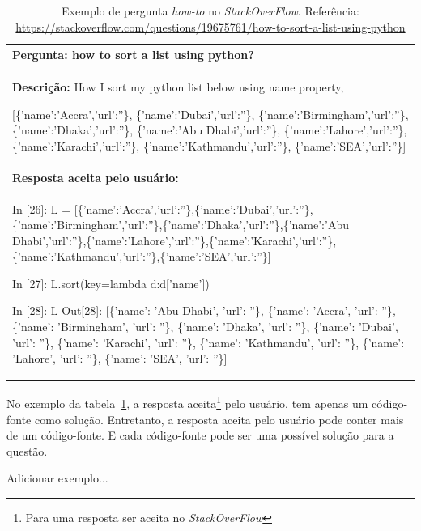 \begin{table}[h!]
\centering
\begin{tabular}{ |p{14cm}| } 
 \hline
 \textbf{Pergunta:} how to sort a list using python? \\ \hline
 \textbf{Descrição:} How I sort my python list below using name property,

 [\{'name':'Accra','url':''\},
  \{'name':'Dubai','url':''\},
  \{'name':'Birmingham','url':''\},
  \{'name':'Dhaka','url':''\},
  \{'name':'Abu Dhabi','url':''\},
  \{'name':'Lahore','url':''\},
  \{'name':'Karachi','url':''\},
  \{'name':'Kathmandu','url':''\},
  \{'name':'SEA','url':''\}]
 \\ \hline
 \textbf{Resposta aceita pelo usuário:}\\ 
 \hline
 In [26]: L = [\{'name':'Accra','url':''\},\{'name':'Dubai','url':''\},\newline\{'name':'Birmingham','url':''\},\{'name':'Dhaka','url':''\},\newline\{'name':'Abu Dhabi','url':''\},\{'name':'Lahore','url':''\},\newline\{'name':'Karachi','url':''\},\{'name':'Kathmandu','url':''\},\newline\{'name':'SEA','url':''\}]

In [27]: L.sort(key=lambda d:d['name'])

In [28]: L
Out[28]: 
[\{'name': 'Abu Dhabi', 'url': ''\},
 \{'name': 'Accra', 'url': ''\},
 \{'name': 'Birmingham', 'url': ''\},
 \{'name': 'Dhaka', 'url': ''\},
 \{'name': 'Dubai', 'url': ''\},
 \{'name': 'Karachi', 'url': ''\},
 \{'name': 'Kathmandu', 'url': ''\},
 \{'name': 'Lahore', 'url': ''\},
 \{'name': 'SEA', 'url': ''\}]\\ 
 \hline
\end{tabular}
\caption{Exemplo de pergunta \textit{how-to} no \textit{StackOverFlow}. Referência: \url{https://stackoverflow.com/questions/19675761/how-to-sort-a-list-using-python}}
\label{table:exemplo-pergunta-stack-over-flow-howto}
\end{table}


No exemplo da tabela~\ref{table:exemplo-pergunta-stack-over-flow-howto}, a resposta aceita\footnote{Para uma resposta ser aceita no \textit{StackOverFlow}} pelo usuário, tem apenas um código-fonte como solução. Entretanto, a resposta aceita pelo usuário pode conter mais de um código-fonte. E cada código-fonte pode ser uma possível solução para a questão.

Adicionar exemplo...




